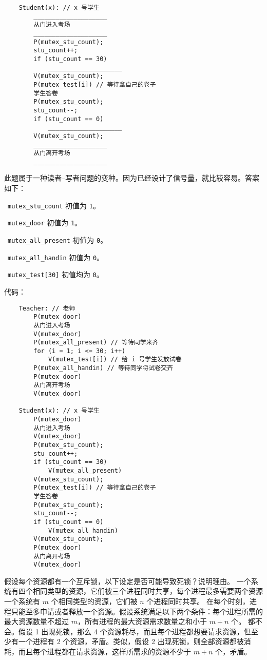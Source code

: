 \begin{problems}
\begin{verbatim}
    Student(x): // x 号学生
        ____________________
        从门进入考场
        ____________________
        P(mutex_stu_count);
        stu_count++;
        if (stu_count == 30)
            ____________________
        V(mutex_stu_count);
        P(mutex_test[i]) // 等待拿自己的卷子
        学生答卷
        P(mutex_stu_count);
        stu_count--;
        if (stu_count == 0)
            ____________________
        V(mutex_stu_count);
        ____________________
        从门离开考场
        ____________________
        \end{verbatim}
        \sol 此题属于一种读者{--}写者问题的变种。因为已经设计了信号量，就比较容易。答案如下：
        \begin{compactitem}
            \item\ \verb|mutex_stu_count| 初值为 \verb|1|。
            \item\ \verb|mutex_door| 初值为 \verb|1|。
            \item\ \verb|mutex_all_present| 初值为 \verb|0|。
            \item\ \verb|mutex_all_handin| 初值为 \verb|0|。
            \item\ \verb|mutex_test[30]| 初值均为 \verb|0|。
        \end{compactitem}
        代码：
        \begin{verbatim}
    Teacher: // 老师
        P(mutex_door)
        从门进入考场
        V(mutex_door)
        P(mutex_all_present) // 等待同学来齐
        for (i = 1; i <= 30; i++)
            V(mutex_test[i]) // 给 i 号学生发放试卷
        P(mutex_all_handin) // 等待同学将试卷交齐
        P(mutex_door)
        从门离开考场
        V(mutex_door)

    Student(x): // x 号学生
        P(mutex_door)
        从门进入考场
        V(mutex_door)
        P(mutex_stu_count);
        stu_count++;
        if (stu_count == 30)
            V(mutex_all_present)
        V(mutex_stu_count);
        P(mutex_test[i]) // 等待拿自己的卷子
        学生答卷
        P(mutex_stu_count);
        stu_count--;
        if (stu_count == 0)
            V(mutex_all_handin)
        V(mutex_stu_count);
        P(mutex_door)
        从门离开考场
        V(mutex_door)
        \end{verbatim}
        \pro 假设每个资源都有一个互斥锁，以下设定是否可能导致死锁？说明理由。
            \qn 一个系统有四个相同类型的资源，它们被三个进程同时共享，每个进程最多需要两个资源一个系统有 $m$ 个相同类型的资源，它们被 $n$ 个进程同时共享。
            \qn 在每个时刻，进程只能至多申请或者释放一个资源。假设系统满足以下两个条件：每个进程所需的最大资源数量不超过 $m$，所有进程的最大资源需求数量之和小于 $m+n$ 个。
        \sol 都不会。假设 1 出现死锁，那么 4 个资源耗尽，而且每个进程都想要请求资源，但至少有一个进程有 2 个资源，矛盾。类似，假设 2 出现死锁，则全部资源都被消耗，而且每个进程都在请求资源，这样所需求的资源不少于 $m+n$ 个，矛盾。
    \end{problems}

